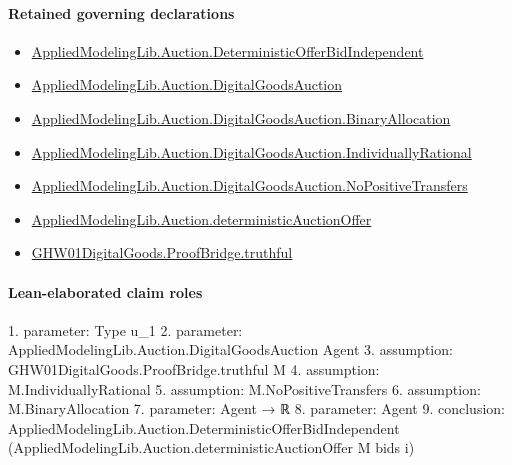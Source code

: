 \documentclass[10pt]{article}
\begin{document}
\paragraph{Retained governing declarations}
\begin{itemize}\raggedright
\item \hyperlink{governing-declaration-08347ff6dd268566}{Applied\allowbreak{}Modeling\allowbreak{}Lib.\allowbreak{}Auction.\allowbreak{}Deterministic\allowbreak{}Offer\allowbreak{}Bid\allowbreak{}Independent}
\item \hyperlink{governing-declaration-7d5372964da104c4}{Applied\allowbreak{}Modeling\allowbreak{}Lib.\allowbreak{}Auction.\allowbreak{}Digital\allowbreak{}Goods\allowbreak{}Auction}
\item \hyperlink{governing-declaration-db44fd9ee659d7f2}{Applied\allowbreak{}Modeling\allowbreak{}Lib.\allowbreak{}Auction.\allowbreak{}Digital\allowbreak{}Goods\allowbreak{}Auction.\allowbreak{}Binary\allowbreak{}Allocation}
\item \hyperlink{governing-declaration-15fae40890710406}{Applied\allowbreak{}Modeling\allowbreak{}Lib.\allowbreak{}Auction.\allowbreak{}Digital\allowbreak{}Goods\allowbreak{}Auction.\allowbreak{}Individually\allowbreak{}Rational}
\item \hyperlink{governing-declaration-2689939b38c1e4d8}{Applied\allowbreak{}Modeling\allowbreak{}Lib.\allowbreak{}Auction.\allowbreak{}Digital\allowbreak{}Goods\allowbreak{}Auction.\allowbreak{}No\allowbreak{}Positive\allowbreak{}Transfers}
\item \hyperlink{governing-declaration-1f5bed3d4f0b866e}{Applied\allowbreak{}Modeling\allowbreak{}Lib.\allowbreak{}Auction.\allowbreak{}deterministic\allowbreak{}Auction\allowbreak{}Offer}
\item \hyperlink{governing-declaration-c1f9c472688cd07d}{GHW01\allowbreak{}Digital\allowbreak{}Goods.\allowbreak{}Proof\allowbreak{}Bridge.\allowbreak{}truthful}
\end{itemize}
\paragraph{Lean-elaborated claim roles}\begin{ReviewVerbatim}
1. parameter: Type u_1
2. parameter: AppliedModelingLib.Auction.DigitalGoodsAuction Agent
3. assumption: GHW01DigitalGoods.ProofBridge.truthful M
4. assumption: M.IndividuallyRational
5. assumption: M.NoPositiveTransfers
6. assumption: M.BinaryAllocation
7. parameter: Agent → ℝ
8. parameter: Agent
9. conclusion: AppliedModelingLib.Auction.DeterministicOfferBidIndependent
  (AppliedModelingLib.Auction.deterministicAuctionOffer M bids i)
\end{ReviewVerbatim}
\end{document}
